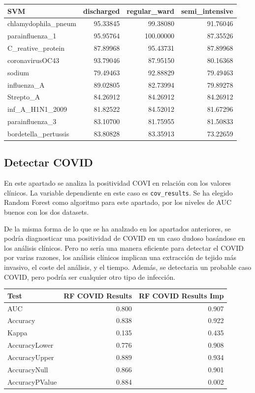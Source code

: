 \documentclass[
]{article}
\begin{document}
\begin{longtable}[]{@{}lrrr@{}}
\toprule()
SVM & discharged & regular\_ward & semi\_intensive \\
\midrule()
\endhead
chlamydophila\_pneum & 95.33845 & 99.38080 & 91.76046 \\
parainfluenza\_1 & 95.95764 & 100.00000 & 87.35526 \\
C\_reative\_protein & 87.89968 & 95.43731 & 87.89968 \\
coronavirusOC43 & 93.79046 & 87.95150 & 80.16368 \\
sodium & 79.49463 & 92.88829 & 79.49463 \\
influenza\_A & 89.02805 & 82.73994 & 79.89278 \\
Strepto\_A & 84.26912 & 84.26912 & 84.26912 \\
inf\_A\_H1N1\_2009 & 81.82522 & 84.52012 & 81.67296 \\
parainfluenza\_3 & 83.10700 & 81.75955 & 81.50833 \\
bordetella\_pertussis & 83.80828 & 83.35913 & 73.22659 \\
\bottomrule()
\end{longtable}

\hypertarget{detectar-covid}{%
\subsection{Detectar COVID}\label{detectar-covid}}

En este apartado se analiza la positividad COVI en relación con los
valores clínicos. La variable dependiente en este caso es
\texttt{cov\_results}. Se ha elegido Random Forest como algoritmo para
este apartado, por los niveles de AUC buenos con los dos datasets.

De la misma forma de lo que se ha analzado en los apartados anteriores,
se podría diagnosticar una positividad de COVID en un caso dudoso
basándose en los análisis clínicos. Pero no sería una manera eficiente
para detectar el COVID por varias razones, los análisis clínicos
implican una extracción de tejido más invasivo, el coste del análisis, y
el tiempo. Además, se detectaria un probable caso COVID, pero podría ser
cualquier otro tipo de infección.

\begin{longtable}[]{@{}lrr@{}}
\toprule()
Test & RF COVID Results & RF COVID Results Imp \\
\midrule()
\endhead
AUC & 0.800 & 0.907 \\
Accuracy & 0.838 & 0.922 \\
Kappa & 0.135 & 0.435 \\
AccuracyLower & 0.776 & 0.908 \\
AccuracyUpper & 0.889 & 0.934 \\
AccuracyNull & 0.866 & 0.901 \\
AccuracyPValue & 0.884 & 0.002 \\
\bottomrule()
\end{longtable}
\end{document}
